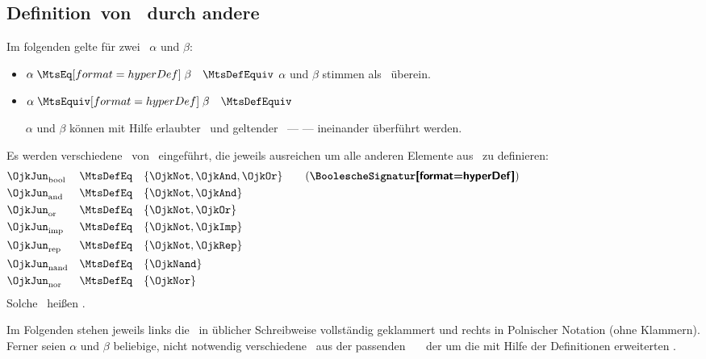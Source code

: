 {\subsection[Definition von Junktoren durch andere]{Definition\ von \Junktoren\ durch andere}
\label                    {sub:JunktorDef}

Im folgenden gelte für zwei \aussagenlogischeFormeln\ $\alpha$ und $\beta$:
\begin{itemize}
	\item[] $\alpha \defSymBin{\MtsEq}    \beta \quad \MtsDefEquiv$ \quad $\alpha$ und $\beta$
	stimmen als \Zeichenkette\ überein.
	\item[] $\alpha \defSymBin{\MtsEquiv} \beta \quad \MtsDefEquiv$ \quad
	\parbox[t]{13cm}{$\alpha$ und $\beta$ können mit Hilfe erlaubter \Ersetzungen\ und geltender \Axiome\ ---  --- ineinander überführt werden.}
\end{itemize}

Es werden verschiedene \Teilmengen\ von \OjkJun\ eingeführt, die jeweils ausreichen um alle anderen Elemente aus \OjkJun\ zu definieren:
\begin{align}
&\OjkJun_{\RawMtsIdxBool}&\MtsDefEq\quad&\{\OjkNot,\OjkAnd,\OjkOr\}\label{def:Jbool}
\qquad \text{(\defTxt{\BoolescheSignatur})}
\\
&\OjkJun_{\RawMtsIdxAnd} &\MtsDefEq\quad&\{\OjkNot,\OjkAnd \}\label{def:Jand}
\\
&\OjkJun_{\RawMtsIdxOr}  &\MtsDefEq\quad&\{\OjkNot,\OjkOr  \}\label{def:Jor}
\\
&\OjkJun_{\RawMtsIdxImp} &\MtsDefEq\quad&\{\OjkNot,\OjkImp \}\label{def:Jimp}
\\
&\OjkJun_{\RawMtsIdxRep} &\MtsDefEq\quad&\{\OjkNot,\OjkRep \}\label{def:Jrep}
\\
&\OjkJun_{\RawMtsIdxNand}&\MtsDefEq\quad&\{\OjkNand        \}\label{def:Jnand}
\\
&\OjkJun_{\RawMtsIdxNor} &\MtsDefEq\quad&\{\OjkNor         \}\label{def:Jnor}
\formulatoleft\formulatoleft\formulatoleft
\end{align}
Solche \Teilmengen\ heißen \logischeSignatur.

Im Folgenden stehen jeweils links die \Formeln\ in üblicher Schreibweise vollständig geklammert und rechts in Polnischer Notation (ohne Klammern).
Ferner seien $\alpha$ und $\beta$ beliebige, nicht notwendig verschiedene \Formeln\ aus der passenden \Menge\ \OjkForx\ \textbzgl\ der um die mit Hilfe der Definitionen erweiterten \Formelmenge.

}
